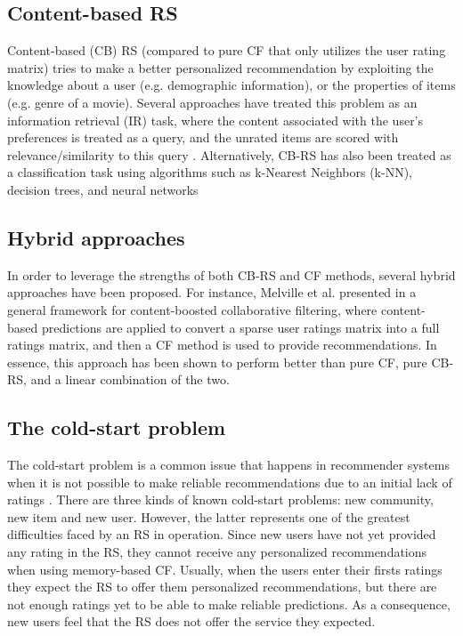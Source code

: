 \subsection{Content-based RS}

Content-based (CB) RS (compared to pure CF that only utilizes the user rating matrix) tries to make a better personalized recommendation by exploiting the knowledge about a user (e.g. demographic information), or the properties of items (e.g. genre of a movie). Several approaches have treated this problem as an information retrieval (IR) task, where the content associated with the user's preferences is treated as a query, and the unrated items are scored with relevance/similarity to this query \cite{balabanovic1997fab}. Alternatively, CB-RS has also been treated as a classification task using algorithms such as k-Nearest Neighbors (k-NN), decision trees, and neural networks \cite{pazzani1997learning}

\subsection{Hybrid approaches}

In order to leverage the strengths of both CB-RS and CF methods, several hybrid approaches have been proposed. For instance, Melville et al. presented in \cite{melville2002content} a general framework for content-boosted collaborative filtering, where content-based predictions are applied to convert a sparse user ratings matrix into a full ratings matrix, and then a CF method is used to provide recommendations. In essence, this approach has been shown to perform better than pure CF, pure CB-RS, and a linear combination of the two.

\subsection{The cold-start problem}

The cold-start problem is a common issue that happens in recommender systems when it is not possible to make reliable recommendations due to an initial lack of ratings \cite{bobadilla2013recommender}. There are three kinds of known cold-start problems: new community, new item and new user. However, the latter represents one of the greatest difficulties faced by an RS in operation. Since new users have not yet provided any rating in the RS, they cannot receive any personalized recommendations when using memory-based CF. Usually, when the users enter their firsts ratings they expect the RS to offer them personalized recommendations, but there are not enough ratings yet to be able to make reliable predictions. As a consequence, new users feel that the RS does not offer the service they expected.

